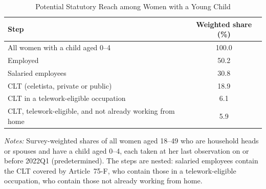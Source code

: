 \begin{table}[H]\centering
\caption{Potential Statutory Reach among Women with a Young Child}
\label{tab:reach}\small
\begin{tabular}{lc}
\toprule
Step & Weighted share (\%) \\
\midrule
All women with a child aged 0--4 & 100.0 \\
Employed & 50.2 \\
Salaried employees & 30.8 \\
CLT (celetista, private or public) & 18.9 \\
CLT in a telework-eligible occupation & 6.1 \\
CLT, telework-eligible, and not already working from home & 5.9 \\
\bottomrule\end{tabular}
\par\vspace{3pt}\footnotesize\raggedright \textit{Notes:} Survey-weighted shares of all women aged 18--49 who are household heads or spouses and have a child aged 0--4, each taken at her last observation on or before 2022Q1 (predetermined). The steps are nested: salaried employees contain the CLT covered by Article~75-F, who contain those in a telework-eligible occupation, who contain those not already working from home.\end{table}
